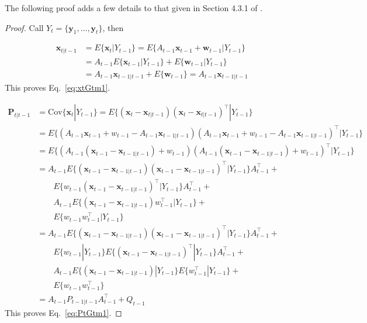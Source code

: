 \documentclass[12pt]{article}
\begin{document}
The following proof adds a few details to that given in Section 4.3.1 of
\citet{durbinAndKoopman12}.

\begin{proof}
    Call $Y_t=\{\mathbf{y}_1,\ldots,\mathbf{y}_t\}$, then

    \begin{align}
        \mathbf{x}_{t|t-1}&=E\{\mathbf{x}_t|Y_{t-1}\}=E\{A_{t-1}\mathbf{x}_{t-1}+\mathbf{w}_{t-1}|Y_{t-1}\}\nonumber\\
                          &=A_{t-1}E\{\mathbf{x}_{t-1}|Y_{t-1}\}+E\{\mathbf{w}_{t-1}|Y_{t-1}\}\nonumber\\
                          &=A_{t-1}\mathbf{x}_{t-1|t-1}+E\{\mathbf{w}_{t-1}\}=A_{t-1}\mathbf{x}_{t-1|t-1}\label{eq:p1n1}
    \end{align}
	This proves Eq.~\ref{eq:xtGtm1}.

    \begin{align}
        \mathbf{P}_{t|t-1}&=\text{Cov}\{\mathbf{x}_t|Y_{t-1}\}=E\{(\mathbf{x}_t-\mathbf{x}_{t|t-1})(\mathbf{x}_t-\mathbf{x}_{t|t-1})^\intercal|Y_{t-1}\}\nonumber\\
                          &=E\{\left(A_{t-1}\mathbf{x}_{t-1}+w_{t-1}-A_{t-1}\mathbf{x}_{t-1|t-1}\right)\left(A_{t-1}\mathbf{x}_{t-1}+w_{t-1}-A_{t-1}\mathbf{x}_{t-1|t-1}\right)^\intercal|Y_{t-1}\}\nonumber\\
                          &=E\{\left(A_{t-1}(\mathbf{x}_{t-1}-\mathbf{x}_{t-1|t-1})+w_{t-1}\right)\left(A_{t-1}(\mathbf{x}_{t-1}-\mathbf{x}_{t-1|t-1})+w_{t-1}\right)^\intercal|Y_{t-1}\}\nonumber\\
                          &=A_{t-1}E\{(\mathbf{x}_{t-1}-\mathbf{x}_{t-1|t-1})(\mathbf{x}_{t-1}-\mathbf{x}_{t-1|t-1})^\intercal|Y_{t-1}\}A_{t-1}^\intercal+\nonumber\\
                          &\qquad E\{w_{t-1}(\mathbf{x}_{t-1}-\mathbf{x}_{t-1|t-1})^\intercal|Y_{t-1}\}A_{t-1}^\intercal+\nonumber\\
                          &\qquad A_{t-1}E\{(\mathbf{x}_{t-1}-\mathbf{x}_{t-1|t-1})w_{t-1}^\intercal|Y_{t-1}\}+\nonumber\\
                          &\qquad E\{w_{t-1}w_{t-1}^\intercal|Y_{t-1}\}\nonumber\\
                          &=A_{t-1}E\{(\mathbf{x}_{t-1}-\mathbf{x}_{t-1|t-1})(\mathbf{x}_{t-1}-\mathbf{x}_{t-1|t-1})^\intercal|Y_{t-1}\}A_{t-1}^\intercal+\nonumber\\
                          &\qquad E\{w_{t-1}|Y_{t-1}\}E\{(\mathbf{x}_{t-1}-\mathbf{x}_{t-1|t-1})^\intercal|Y_{t-1}\}A_{t-1}^\intercal+\nonumber\\
                          &\qquad A_{t-1}E\{(\mathbf{x}_{t-1}-\mathbf{x}_{t-1|t-1})|Y_{t-1}\}E\{w_{t-1}^\intercal|Y_{t-1}\}+\nonumber\\
                          &\qquad E\{w_{t-1}w_{t-1}^\intercal\}\label{eq:p1n2}\\
                          &=A_{t-1}P_{t-1|t-1}A_{t-1}^\intercal+Q_{t-1}\label{eq:p1n3}
    \end{align}
	This proves Eq.~\ref{eq:PtGtm1}.


\end{proof}
\end{document}
